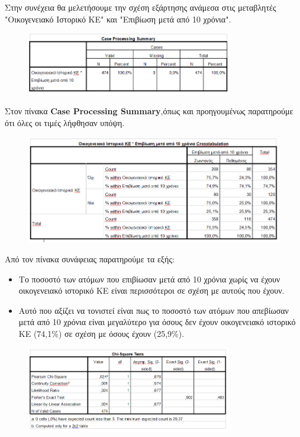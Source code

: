 \clearpage
Στην συνέχεια θα μελετήσουμε την σχέση εξάρτησης ανάμεσα στις μεταβλητές "Οικογενειακό Ιστορικό ΚΕ" και "Επιβίωση μετά από 10 χρόνια".

\begin{figure}[h]
    \centering
    \includegraphics[width=0.8\textwidth]{images/106.PNG}
\end{figure}

Στον πίνακα \textbf{Case Processing Summary},όπως και προηγουμένως παρατηρούμε ότι όλες οι τιμές λήφθησαν υπόψη. 

\begin{figure}[h]
    \centering
    \includegraphics[width=\textwidth]{images/107.PNG}
\end{figure}

Από τον πίνακα συνάφειας παρατηρούμε τα εξής:
\begin{itemize}
    \item Το ποσοστό των ατόμων που επιβίωσαν μετά από 10 χρόνια χωρίς να έχουν οικογενειακό ιστορικό ΚΕ είναι περισσότεροι σε σχέση με αυτούς που έχουν.
    \item Αυτό που αξίζει να τονιστεί είναι πως το ποσοστό των ατόμων που απεβίωσαν μετά από 10 χρόνια είναι μεγαλύτερο για όσους δεν έχουν οικογενειακό ιστορικό ΚΕ (74,1\%) σε σχέση με όσους έχουν (25,9\%).
\end{itemize}

\clearpage

\begin{figure}[h]
    \centering
    \includegraphics[width=0.8\textwidth]{images/108.PNG}
\end{figure}

